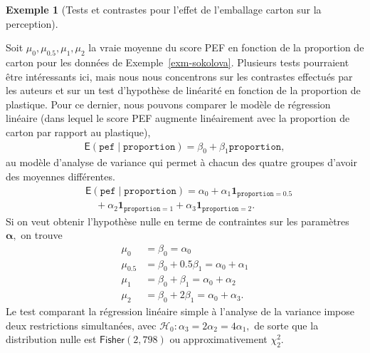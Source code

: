 \documentclass[
  11pt,
  letterpaper,
]{scrbook}
\theoremstyle{plain}
\theoremstyle{plain}
\theoremstyle{definition}
\newtheorem{example}{Exemple}[chapter]
\theoremstyle{definition}
\theoremstyle{remark}
\begin{document}
\begin{example}[Tests et contrastes pour l'effet de l'emballage carton
sur la
perception]\protect\hypertarget{exm-paperorplastic}{}\label{exm-paperorplastic}

Soit \(\mu_{0}, \mu_{0.5}, \mu_{1}, \mu_2\) la vraie moyenne du score
PEF en fonction de la proportion de carton pour les données de
Exemple~\ref{exm-sokolova}. Plusieurs tests pourraient être intéressants
ici, mais nous nous concentrons sur les contrastes effectués par les
auteurs et sur un test d'hypothèse de linéarité en fonction de la
proportion de plastique. Pour ce dernier, nous pouvons comparer le
modèle de régression linéaire (dans lequel le score PEF augmente
linéairement avec la proportion de carton par rapport au plastique),
\begin{align*}
 \mathsf{E}(\texttt{pef} \mid \texttt{proportion}) = \beta_0 + \beta_1\texttt{proportion},
 \end{align*} au modèle d'analyse de variance qui permet à chacun des
quatre groupes d'avoir des moyennes différentes. \begin{align*}
 &\mathsf{E}(\texttt{pef} \mid \texttt{proportion}) = \alpha_0 + \alpha_1 \mathbf{1}_{\texttt{proportion}=0.5} \\&\quad + \alpha_2 \mathbf{1}_{\texttt{proportion}=1} + \alpha_3\mathbf{1}_{\texttt{proportion}=2}.
\end{align*} Si on veut obtenir l'hypothèse nulle en terme de
contraintes sur les paramètres \(\boldsymbol{\alpha},\) on trouve
\begin{align*}
\mu_0 &= \beta_0=\alpha_0 \\
\mu_{0.5} &= \beta_0 + 0.5 \beta_1 = \alpha_0 + \alpha_1\\
\mu_1 &= \beta_0 + \beta_1 = \alpha_0 + \alpha_2 \\
\mu_2 &= \beta_0 + 2 \beta_1= \alpha_0 + \alpha_3.
\end{align*} Le test comparant la régression linéaire simple à l'analyse
de la variance impose deux restrictions simultanées, avec
\(\mathscr{H}_0 : \alpha_3 = 2\alpha_2= 4\alpha_1,\) de sorte que la
distribution nulle est \(\mathsf{Fisher}(2, 798)\) ou approximativement
\(\chi^2_2.\)


\end{example}
\end{document}
